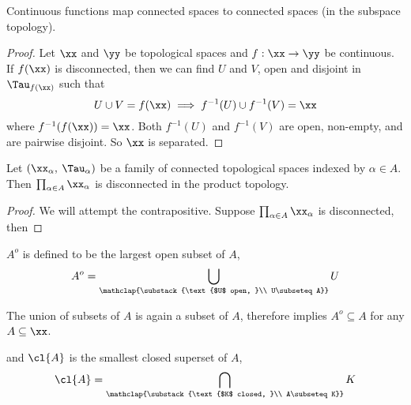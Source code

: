 \documentclass[../main-v2-manifolds.tex]{subfiles}
\begin{document}
\begin{wts}
    Continuous functions map connected spaces to connected spaces (in the subspace topology).
\end{wts}
\begin{proof}
    Let $\xx$ and $\yy$ be topological spaces and $f: \xx\to\yy$ be continuous. If $f(\xx)$ is disconnected, then we can find $U$ and $V$, open and disjoint in $\Tau_{f(\xx)}$ such that
    \[
        U\cup V = f(\xx)\implies f^{-1}(U)\cup f^{-1}(V) = \xx
    \]
    where $f^{-1}(f(\xx)) = \xx$. Both $f^{-1}(U)$ and $f^{-1}(V)$ are open, non-empty, and are pairwise disjoint. So $\xx$ is separated.
\end{proof}

\begin{wts}
    Let $(\xx_\alpha,\: \Tau_{\alpha})$ be a family of connected topological spaces indexed by $\alpha\in A$. Then $\prod_{\alpha\in A}\xx_\alpha$ is disconnected in the product topology.
\end{wts}
\begin{proof}
    We will attempt the contrapositive. Suppose $\prod_{\alpha\in A}\xx_\alpha$ is disconnected, then
\end{proof}



\begin{definition}\label{chp4:interior-definition}
    $A^o$ is defined to be the largest open subset of $A$, 
    \[
        A^o = \bigcup_{\mathclap{\substack{\text{$U$ open, }\\ U\subseteq A}}} U
    \]
\end{definition}
\begin{corollary}\label{chp4:interior-subset}
    The union of subsets of $A$ is again a subset of $A$, therefore  implies $A^o\subseteq A$ for any $A\subseteq \xx$. 
\end{corollary}


\begin{definition}\label{chp4:closure-definition}
    and $\cl{A}$ is the smallest closed superset of $A$,
    \[
        \cl{A} = \bigcap_{\mathclap{\substack{\text{$K$ closed, }\\ A\subseteq K}}} K
    \]
\end{definition}
\end{document}
